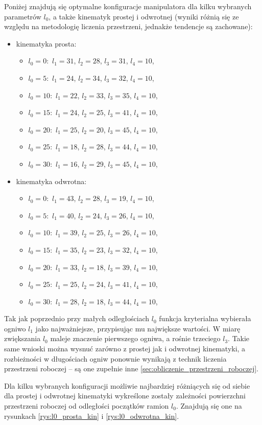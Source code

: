 \documentclass[printmode]{mgr}
\begin{document}
Poniżej znajdują się optymalne konfiguracje manipulatora dla kilku wybranych parametrów $l_0$, a także kinematyk prostej i odwrotnej
(wyniki różnią się ze względu na metodologię liczenia przestrzeni, jednakże tendencje są zachowane):
\begin{itemize}
\item kinematyka prosta:
\begin{itemize}
\item $l_0=0:$ $l_1=31$, $l_2=28$, $l_3=31$, $l_4=10$,
\item $l_0=5:$ $l_1=24$, $l_2=34$, $l_3=32$, $l_4=10$,
\item $l_0=10:$ $l_1=22$, $l_2=33$, $l_3=35$, $l_4=10$,
\item $l_0=15:$ $l_1=24$, $l_2=25$, $l_3=41$, $l_4=10$,
\item $l_0=20:$ $l_1=25$, $l_2=20$, $l_3=45$, $l_4=10$,
\item $l_0=25:$ $l_1=18$, $l_2=28$, $l_3=44$, $l_4=10$,
\item $l_0=30:$ $l_1=16$, $l_2=29$, $l_3=45$, $l_4=10$,
\end{itemize}
\item kinematyka odwrotna:
\begin{itemize}
\item $l_0=0:$ $l_1=43$, $l_2=28$, $l_3=19$, $l_4=10$,
\item $l_0=5:$ $l_1=40$, $l_2=24$, $l_3=26$, $l_4=10$,
\item $l_0=10:$ $l_1=39$, $l_2=25$, $l_3=26$, $l_4=10$,
\item $l_0=15:$ $l_1=35$, $l_2=23$, $l_3=32$, $l_4=10$,
\item $l_0=20:$ $l_1=33$, $l_2=18$, $l_3=39$, $l_4=10$,
\item $l_0=25:$ $l_1=25$, $l_2=24$, $l_3=41$, $l_4=10$,
\item $l_0=30:$ $l_1=28$, $l_2=18$, $l_3=44$, $l_4=10$,
\end{itemize}
\end{itemize}

Tak jak poprzednio przy małych odległościach $l_0$ funkcja kryterialna wybierała ogniwo $l_1$ jako najważniejsze, przypisując mu
największe wartości. W miarę zwiększania $l_0$ maleje znaczenie pierwszego ogniwa, a rośnie trzeciego $l_3$. Takie same wnioski
można wysnuć zarówno z prostej jak i odwrotnej kinematyki, a rozbieżności w długościach ogniw ponownie wynikają z technik liczenia przestrzeni
roboczej -- są one zupełnie inne \ref{sec:obliczenie_przestrzeni_roboczej}.

Dla kilku wybranych konfiguracji możliwie najbardziej różniących się od siebie dla prostej i odwrotnej kinematyki
wykreślone zostały zależności powierzchni przestrzeni roboczej od odległości początków ramion $l_0$. Znajdują się one
na rysunkach \ref{rys:l0_prosta_kin} i \ref{rys:l0_odwrotna_kin}.
\end{document}
